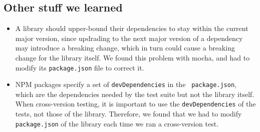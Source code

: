 \subsection{Other stuff we learned}
\begin{itemize}
\item A library should upper-bound their dependencies to stay within
  the current major version, since updrading to the next major version
  of a dependency may introduce a breaking change, which in turn could
  cause a breaking change for the library itself. We found this
  problem with mocha, and had to modify its {\tt package.json} file to
  correct it.
\item NPM packages specify a set of {\tt devDependencies} in the {\tt
    package.json}, which are the dependencies needed by the test suite
  but not the library itself. When cross-version testing, it is
  important to use the {\tt devDependencies} of the tests, not those
  of the library. Therefore, we found that we had to modify {\tt
    package.json} of the library each time we ran a cross-version
  test.
\end{itemize}
